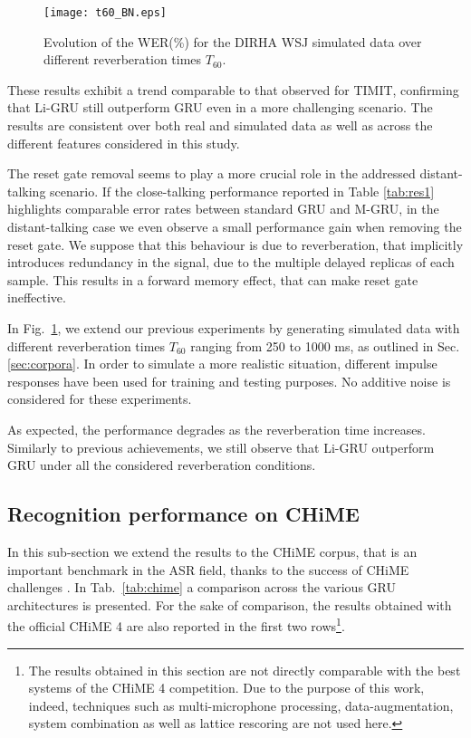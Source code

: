 \documentclass[journal]{IEEEtran}
\begin{document}
\begin{figure}[t]
\centering
  \texttt{[image: t60\_BN.eps]}
\caption{Evolution of the WER(\%) for the DIRHA WSJ simulated data over different reverberation times $T_{60}$. }\label{fig:t60}
\end{figure}
These results exhibit a trend comparable to that observed for TIMIT, confirming that Li-GRU still outperform GRU even in a more challenging scenario. The results are consistent over both real and simulated data as well as across the different features considered in this study.

The reset gate removal seems to play a more crucial role in the addressed distant-talking scenario.  If the close-talking performance reported in Table \ref{tab:res1} highlights comparable error rates between standard GRU and M-GRU, in the distant-talking case we even observe a  small performance gain when removing the reset gate. We suppose that this behaviour is due to reverberation, that implicitly introduces redundancy in the signal, due to the multiple delayed replicas of each sample. This results in a forward memory effect, that can make reset gate ineffective. 

In Fig.~\ref{fig:t60}, we extend our previous experiments by generating simulated data with different reverberation times $T_{60}$ ranging from 250 to 1000 ms, as outlined in Sec. \ref{sec:corpora}. In order to simulate a more realistic situation, different impulse responses have been used for training and testing purposes. No additive noise is considered for these experiments.

As expected, the performance degrades as the reverberation time increases. Similarly to previous achievements, we still observe that Li-GRU outperform GRU under all the considered reverberation conditions. 

\subsection{Recognition performance on CHiME} \label{sec:chime}
In this sub-section we extend the results to the CHiME corpus, that is an important benchmark in the ASR field, thanks to the success of CHiME challenges \cite{chime,chime3}. In Tab.~\ref{tab:chime} a comparison across the various GRU architectures is presented. For the sake of comparison, the results obtained with the official CHiME 4 are also reported in the first two rows\footnote{The results obtained in this section are not directly comparable with the best systems of the CHiME 4 competition. Due to the purpose of this work, indeed, techniques such as multi-microphone processing, data-augmentation, system combination as well as lattice rescoring are not used here.}. 
\end{document}
